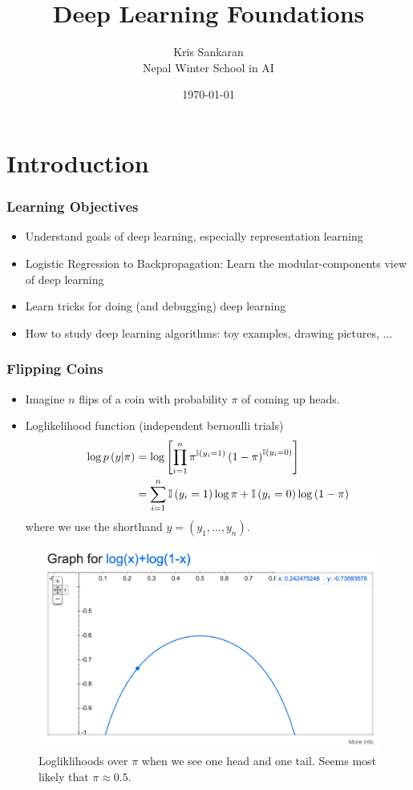 \documentclass[10pt,mathserif]{beamer}
\title{\large \bfseries Deep Learning Foundations}
\author{Kris Sankaran\\[3ex] Nepal Winter School in AI}
\date{\today}
\begin{document}
\maketitle

\section{Introduction}
\label{sec:introduction}

\begin{frame}
  \frametitle{Learning Objectives}
  \begin{itemize}
    \item Understand goals of deep learning, especially representation learning
    \item Logistic Regression to Backpropagation: Learn the modular-components
      view of deep learning
    \item Learn tricks for doing (and debugging) deep learning
    \item How to study deep learning algorithms: toy examples,
      drawing pictures, ...
  \end{itemize}
\end{frame}

\begin{frame}
  \frametitle{Flipping Coins}
  \begin{itemize}
  \item Imagine $n$ flips of a coin with probability $\pi$ of coming up heads.
  \item Loglikelihood function (independent bernoulli trials)
    \begin{align*}
      \log p\left(y \vert \pi \right) &= \log \left[\prod_{i = 1}^{n} \pi^{\mathbb{I}\left({y_i = 1}\right)}\left(1 - \pi\right)^{\mathbb{I}\left({y_i = 0}\right)}\right] \\
      &= \sum_{i = 1}^{n} \mathbb{I}\left({y_i = 1}\right)\log \pi + \mathbb{I}\left({y_i = 0}\right)\log\left(1 - \pi\right)
    \end{align*}
    where we use the shorthand $y = \left(y_1, \dots, y_n\right)$.
  \end{itemize}
  \begin{figure}[ht]
    \centering
    \includegraphics[width=0.3\paperwidth]{figure/loglikelihood_bernoulli}
    \caption{Logliklihoods over $\pi$ when we see one head and one tail. Seems
      most likely that $\pi \approx 0.5$. \label{fig:loglikelihood_bernoulli} }
  \end{figure}
\end{frame}
\end{document}
